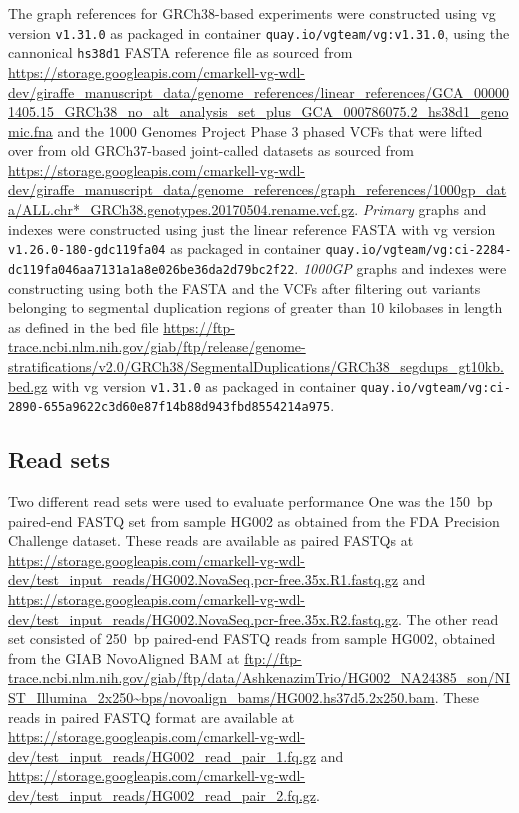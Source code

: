 \documentclass[11pt]{ucscthesis}
\newcommand{\vocab}[1]{\emph{#1}}
\begin{document}
The graph references for GRCh38-based experiments were constructed using vg version \texttt{v1.31.0} as packaged in container \texttt{quay.io/vgteam/vg:v1.31.0}, using the cannonical \texttt{hs38d1} FASTA reference file as sourced from \url{https://storage.googleapis.com/cmarkell-vg-wdl-dev/giraffe_manuscript_data/genome_references/linear_references/GCA_000001405.15_GRCh38_no_alt_analysis_set_plus_GCA_000786075.2_hs38d1_genomic.fna} and the 1000 Genomes Project Phase 3 phased VCFs that were lifted over from old GRCh37-based joint-called datasets as sourced from \url{https://storage.googleapis.com/cmarkell-vg-wdl-dev/giraffe_manuscript_data/genome_references/graph_references/1000gp_data/ALL.chr*_GRCh38.genotypes.20170504.rename.vcf.gz}.
\vocab{Primary} graphs and indexes were constructed using just the linear reference FASTA with vg version \texttt{v1.26.0-180-gdc119fa04} as packaged in container \texttt{quay.io/vgteam/vg:ci-2284-dc119fa046aa7131a1a8e026be36da2d79bc2f22}.
\vocab{1000GP} graphs and indexes were constructing using both the FASTA and the VCFs after filtering out variants belonging to segmental duplication regions of greater than 10 kilobases in length as defined in the bed file \url{https://ftp-trace.ncbi.nlm.nih.gov/giab/ftp/release/genome-stratifications/v2.0/GRCh38/SegmentalDuplications/GRCh38_segdups_gt10kb.bed.gz} with vg version \texttt{v1.31.0} as packaged in container \texttt{quay.io/vgteam/vg:ci-2890-655a9622c3d60e87f14b88d943fbd8554214a975}.

\subsection{Read sets}
Two different read sets were used to evaluate performance
One was the 150~bp paired-end FASTQ set from sample HG002 as obtained from the FDA Precision Challenge dataset.
These reads are available as paired FASTQs at \url{https://storage.googleapis.com/cmarkell-vg-wdl-dev/test_input_reads/HG002.NovaSeq.pcr-free.35x.R1.fastq.gz} and \url{https://storage.googleapis.com/cmarkell-vg-wdl-dev/test_input_reads/HG002.NovaSeq.pcr-free.35x.R2.fastq.gz}.
The other read set consisted of 250~bp paired-end FASTQ reads from sample HG002, obtained from the GIAB NovoAligned BAM at \url{ftp://ftp-trace.ncbi.nlm.nih.gov/giab/ftp/data/AshkenazimTrio/HG002_NA24385_son/NIST_Illumina_2x250~bps/novoalign_bams/HG002.hs37d5.2x250.bam}.
These reads in paired FASTQ format are available at \url{https://storage.googleapis.com/cmarkell-vg-wdl-dev/test_input_reads/HG002_read_pair_1.fq.gz} and \url{https://storage.googleapis.com/cmarkell-vg-wdl-dev/test_input_reads/HG002_read_pair_2.fq.gz}.
\end{document}
